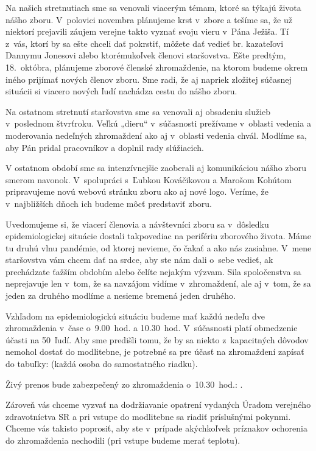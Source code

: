 Na našich stretnutiach sme sa venovali viacerým témam, ktoré sa týkajú života nášho zboru. V~polovici novembra plánujeme krst v~zbore a tešíme sa, že už niektorí prejavili záujem verejne takto vyznať svoju vieru v~Pána Ježiša. Tí z~vás, ktorí by sa ešte chceli dať pokrstiť, môžete dať vedieť br. kazateľovi Dannymu Jonesovi alebo ktorémukoľvek členovi staršovstva. Ešte predtým, 18.~októbra, plánujeme zborové členské zhromaždenie, na ktorom budeme okrem iného prijímať nových členov zboru. Sme radi, že aj napriek zložitej súčasnej situácii si viacero nových ľudí nachádza cestu do nášho zboru.

Na ostatnom stretnutí staršovstva sme sa venovali aj obsadeniu služieb v~poslednom štvrťroku. Veľkú „dieru“ v~súčasnosti prežívame v~oblasti vedenia a moderovania nedeľných zhromaždení ako aj v~oblasti vedenia chvál. Modlíme sa, aby Pán pridal pracovníkov a doplnil rady slúžiacich.

V ostatnom období sme sa intenzívnejšie zaoberali aj komunikáciou nášho zboru smerom navonok. V~spolupráci s~Ľubkou Kováčikovou a Marošom Kohútom pripravujeme novú webovú stránku zboru ako aj nové logo. Veríme, že v~najbližších dňoch ich budeme môcť predstaviť zboru.

Uvedomujeme si, že viacerí členovia a návštevníci zboru sa v~dôsledku epidemiologickej situácie dostali takpovediac na perifériu zborového života. Máme tu druhú vlnu pandémie, od ktorej nevieme, čo čakať a ako nás zasiahne. V~mene staršovstva vám chcem dať na srdce, aby ste nám dali o~sebe vedieť, ak prechádzate ťažším obdobím alebo čelíte nejakým výzvam. Sila spoločenstva sa neprejavuje len v~tom, že sa navzájom vidíme v~zhromaždení, ale aj v~tom, že sa jeden za druhého modlíme a nesieme bremená jeden druhého.



Vzhľadom na epidemiologickú situáciu budeme mať každú nedeľu dve zhromaždenia v~čase o~9.00~hod. a 10.30~hod. V~súčasnosti platí obmedzenie účasti na 50~ľudí. Aby sme predišli tomu, že by sa niekto z~kapacitných dôvodov nemohol dostať do modlitebne, je potrebné sa pre účasť na zhromaždení zapísať do tabuľky:  (každá osoba do samostatného riadku).

Živý prenos bude zabezpečený zo zhromaždenia o~10.30~hod.: .

Zároveň vás chceme vyzvať na dodržiavanie opatrení vydaných Úradom verejného zdravotníctva SR a pri vstupe do modlitebne sa riadiť príslušnými pokynmi. Chceme vás takisto poprosiť, aby ste v~prípade akýchkoľvek príznakov ochorenia do zhromaždenia nechodili (pri vstupe budeme merať teplotu).


